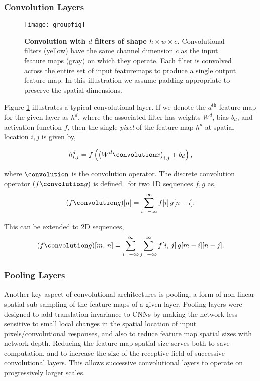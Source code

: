 \documentclass[thesis]{subfiles}
\begin{document}
\subsubsection{Convolution Layers}
\begin{figure}[tb]
	\centering
	\texttt{[image: groupfig]}
	\caption[Illustration of convolutional layer]{\textbf{Convolution with $d$ filters of shape $h\times w\times c$.} Convolutional filters (yellow) have the same channel dimension $c$ as the input feature maps (gray) on which they operate. Each filter is convolved across the entire set of input featuremaps to produce a single output feature map. In this illustration we assume padding appropriate to preserve the spatial dimensions.}
	\label{fig:convlayer}
\end{figure}

Figure \ref{fig:convlayer} illustrates a typical convolutional layer. If we denote the $d^{\text{th}}$ feature map for the given layer as $h^d$, where the associated filter has weights $W^d$, bias $b_d$, and activation function $f$, then the single \emph{pixel} of the feature map $h^d$ at spatial location $i, j$ is given by,

\begin{equation}
	h^d_{i,j} = f\left( \left(W^d \convolution x \right)_{i,j} + b_d \right),
\end{equation}

where $\convolution$ is the convolution operator. The discrete convolution operator $(f \convolution g)$ is defined~\citep{damelin2011} for two 1D sequences $f, g$ as,
\begin{equation}
	(f \convolution g)[n] = \sum_{i=-\infty}^\infty f[i]\, g[n - i].
\end{equation}

This can be extended to 2D sequences,
\begin{equation}
(f \convolution g)[m,\,n] = \sum_{i=-\infty}^\infty \sum_{j=-\infty}^\infty f[i,\,j]\, g[m - i][n - j].
\end{equation}

\subsubsection{Pooling Layers}
Another key aspect of convolutional architectures is pooling, a form of non-linear spatial sub-sampling of the feature maps of a given layer. Pooling layers were designed to add translation invariance to CNNs by making the network less sensitive to small local changes in the spatial location of input pixels/convolutional responses, and also to reduce feature map spatial sizes with network depth. Reducing the feature map spatial size serves both to save computation, and to increase the size of the receptive field of successive convolutional layers. This allows successive convolutional layers to operate on progressively larger scales.
\end{document}
